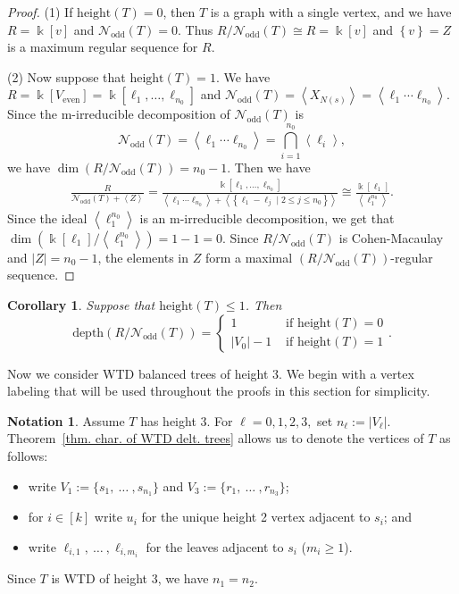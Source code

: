 \documentclass[12pt, reqno]{amsart}
\theoremstyle{definition}
\theoremstyle{plain}
\newtheorem{corollary}[theorem]{Corollary}
\theoremstyle{definition}
\newtheorem{notation}[theorem]{Notation}
\newcommand{\depth}{\mbox{depth}}
\newcommand{\hh}{\mbox{height}}
\newcommand{\kk}{\Bbbk}
\newcommand\gen[1]{\left\langle #1 \right\rangle}
\newcommand\Set[2]{\left\lbrace #1 \mid #2 \right\rbrace}
\newcommand\set[1]{\left\lbrace #1 \right\rbrace}
\newcommand{\NN}{\mathcal{N}}
\begin{document}
\begin{proof}
    (1) If $\hh(T) = 0$, then $T$ is a graph with a single vertex, and we have $R = \kk[v]$ and $\NN_{\text{odd}}(T) = 0$.
    Thus $R/\NN_{\text{odd}}(T) \cong R = \kk[v]$ and $\set{v} = Z$ is a maximum regular sequence for $R$.

    (2) Now suppose that $\hh(T) = 1$.
    We have $R = \kk[V_{\text{even}}] = \kk[\ell_{1},\dots, \ell_{n_0}]$ and $\NN_{\text{odd}}(T) = \gen{X_{N(s)}} = \gen{\ell_{1}\cdots\ell_{n_0}}$.
    Since the m-irreducible decomposition of $\NN_{\text{odd}}(T)$ is
    $$
    \NN_{\text{odd}}(T) = \gen{\ell_{1}\cdots \ell_{n_0}} = \bigcap_{i = 1}^{n_0} \gen{\ell_{i}},
    $$
    we have $\dim(R/\NN_{\text{odd}}(T)) = n_0 - 1$.
    Then we have
    \begin{align*}
        \frac{R}{\NN_{\text{odd}}(T) + \gen{Z}} = \frac{\kk[\ell_{1},\dots, \ell_{n_0}]}{\gen{\ell_{1}\cdots\ell_{n_0}}+\gen{\Set{\ell_{1}-\ell_{j}}{2 \leq j \leq n_0}}} \cong \frac{\kk[\ell_{1}]}{\gen{\ell_{1}^{n_0}}}.
    \end{align*}
    Since the ideal $\gen{\ell_{1}^{n_0}}$ is an m-irreducible decomposition, we get that $\dim(\kk[\ell_{1}]/\gen{\ell_{1}^{n_0}}) = 1 - 1 = 0$.
    Since $R/\NN_{\text{odd}}(T)$ is Cohen-Macaulay and $|Z| = n_0 - 1$, 
    the elements in $Z$ form a maximal $(R/\NN_{\text{odd}}(T))$-regular sequence.
\end{proof}

\begin{corollary}\label{cor. depth for ht 0 and 1}
Suppose that $\hh(T) \leq 1$. Then
$$
\depth(R/\NN_{\text{odd}}(T)) = \begin{cases}
1 & \mbox{ if }\hh(T) = 0\\
|V_0|-1 & \mbox{ if } \hh(T) = 1
\end{cases}.
$$
\end{corollary}

Now we consider WTD balanced trees of height 3.
We begin with a vertex labeling that will be used throughout the proofs in this section for simplicity.

\begin{notation}\label{notation. vertex labling}
Assume $T$ has height 3.
For $\ell = 0,1,2,3,$ set $n_\ell := |V_\ell|$.
Theorem~\ref{thm. char. of WTD delt. trees} allows us to denote the vertices of $T$ as follows:
\begin{itemize}
\item[(1)] write $V_1 := \{s_1,\ \dots\ ,s_{n_1}\}$ and $V_3 := \{r_1,\ \dots\ ,r_{n_3}\}$; 
\item[(2)] for $i \in [k]$ write $u_i$ for the unique height 2 vertex adjacent to $s_i$; and
\item[(3)] write $\ell_{i,1},\ \dots\ ,\ell_{i,m_i}$ for the leaves adjacent to $s_i$ ($m_i \geq 1$).
\end{itemize}   
Since $T$ is WTD of height 3, we have $n_1 = n_2$.
\end{notation}
\end{document}
